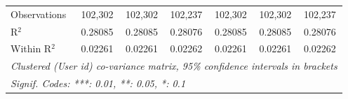 \begin{table}[htbp]
\begin{threeparttable}[b]
\begin{tabular}{lcccccc}
         Observations               & 102,302             & 102,302             & 102,237             & 102,302             & 102,302             & 102,237\\  
         R$^2$                      & 0.28085             & 0.28085             & 0.28076             & 0.28085             & 0.28085             & 0.28076\\  
         Within R$^2$               & 0.02261             & 0.02261             & 0.02262             & 0.02261             & 0.02261             & 0.02262\\  
         \midrule \midrule
         \multicolumn{7}{l}{\emph{Clustered (User id) co-variance matrix, 95\% confidence intervals in brackets}}\\
         \multicolumn{7}{l}{\emph{Signif. Codes: ***: 0.01, **: 0.05, *: 0.1}}\\
      \end{tabular}
   \end{threeparttable}
\end{table}


